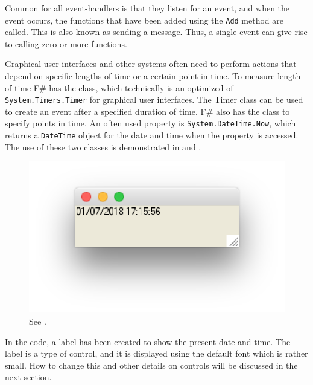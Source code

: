 \documentclass[fsharpnotes.tex]{subfiles}
\begin{document}
Common for all event-handlers is that they listen for an event, and when the event occurs, the functions that have been added using the \lstinline{Add} method are called. This is also known as sending a message. Thus, a single event can give rise to calling zero or more functions.

Graphical user interfaces and other systems often need to perform actions that depend on specific lengths of time or a certain point in time. To measure length of time F\# has the  class, which technically is an optimized of \lstinline{System.Timers.Timer} for graphical user interfaces. The Timer class can be used to create an event after a specified duration of time. F\# also has the  class to specify points in time. An often used property is \lstinline{System.DateTime.Now}, which returns a \lstinline{DateTime} object for the date and time when the property is accessed. The use of these two classes is demonstrated in  and .
%
%
\begin{figure}
  \centering
  \includegraphics[scale=0.3]{clock}
  \caption{See .}
  \label{fig:clock}
\end{figure}
In the code, a label has been created to show the present date and time. The label is a type of control, and it is displayed using the default font which is rather small. How to change this and other details on controls will be discussed in the next section.
\end{document}
